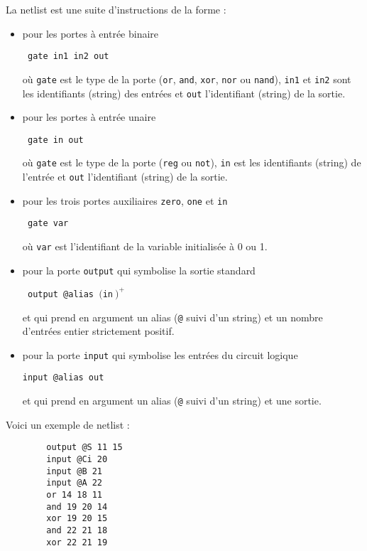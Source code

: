 \documentclass{article}
\begin{document}
La netlist est une suite d'instructions de la forme :
\begin{itemize}
  \item pour les portes à entrée binaire
  \begin{center}
    \texttt{
      gate in1 in2 out
    }
  \end{center}
  où \texttt{gate} est le type de la porte (\texttt{or}, \texttt{and}, \texttt{xor}, \texttt{nor} ou \texttt{nand}), \texttt{in1} et \texttt{in2} sont les identifiants (string) des entrées et \texttt{out} l'identifiant (string) de la sortie.

  \item pour les portes à entrée unaire
    \begin{center}
      \texttt{
        gate in out
      }
    \end{center}
  où \texttt{gate} est le type de la porte (\texttt{reg} ou \texttt{not}), \texttt{in} est les identifiants (string) de l'entrée et \texttt{out} l'identifiant (string) de la sortie.

  \item pour les trois portes auxiliaires \texttt{zero}, \texttt{one} et \texttt{in} 
    \begin{center}
      \texttt{ gate var }
    \end{center}
    où \texttt{var} est l'identifiant de la variable initialisée à 0 ou 1.

  \item pour la porte \texttt{output} qui symbolise la sortie standard
    \begin{center}
      \texttt{ output @alias }$($\texttt{in}$\ )^+$
    \end{center}
    et qui prend en argument un alias (\texttt{@} suivi d'un string)
    et un nombre d'entrées entier strictement positif.

  \item pour la porte \texttt{input} qui symbolise les entrées du
    circuit logique
    \begin{center}
      \texttt{input @alias out}
    \end{center}
    et qui prend en argument un alias (\texttt{@} suivi d'un string)
    et une sortie.
\end{itemize}

\vspace{0.3cm}
Voici un exemple de netlist :
\begin{verbatim}
        output @S 11 15 
        input @Ci 20 
        input @B 21 
        input @A 22 
        or 14 18 11 
        and 19 20 14 
        xor 19 20 15 
        and 22 21 18 
        xor 22 21 19
\end{verbatim}
\end{document}
